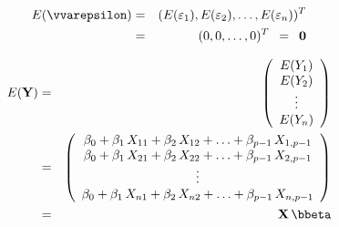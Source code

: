 \documentclass[a4paper]{article}
\theoremstyle{myexamplestyle}
\begin{document}
\begin{eqnarray*}
E(\vvarepsilon) & = & (E(\varepsilon_1), E(\varepsilon_2), \ldots, E(\varepsilon_n))^T
\\
& = & (0, 0, \ldots, 0)^T \, \, \, = \, \, \, \mathbf{0}
\end{eqnarray*}


\begin{eqnarray*}
E(\mathbf{Y}) & = &
\left(
\begin{array}{c}
E(Y_1)
\\
E(Y_2)
\\
\vdots
\\
E(Y_n)
\end{array} \right)
\\
& = &
\left(
\begin{array}{c}
\beta_0 + \beta_1 \, X_{11}  + \beta_2 \, X_{12} + \ldots  + \beta_{p-1} \, X_{1, p-1}
\\
\beta_0 + \beta_1 \, X_{21}  + \beta_2 \, X_{22} + \ldots  + \beta_{p-1} \, X_{2, p-1}
\\
\vdots
\\
\beta_0 + \beta_1 \, X_{n1}  + \beta_2 \, X_{n2} + \ldots  + \beta_{p-1} \, X_{n, p-1}
\end{array} \right)
\\
& = & \mathbf{X} \, \bbeta
\end{eqnarray*}
\end{document}
